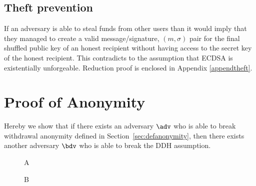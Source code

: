 \documentclass[a4paper,UKenglish,cleveref, autoref]{oasics-v2019}
\begin{document}
\begin{appendices}
\subsection{Theft prevention} 
If an adversary is able to steal funds from other users than it would imply that they managed to create a valid message/signature, $(m,\sigma)$ pair for the final shuffled public key of an honest recipient without having access to the secret key of the honest recipient. This contradicts to the assumption that ECDSA is existentially unforgeable. Reduction proof is enclosed in Appendix \ref*{appendtheft}.
	
	\section{Proof of Anonymity} \label{appendanon}
	Hereby we show that if there exists an adversary $\adv$ who is able to break withdrawal anonymity defined in Section~\ref{sec:defanonymity}, then there exists another adversary $\bdv$ who is able to break the DDH assumption.
	
	\begin{wrapfigure}{r}{0.5\textwidth}
		\centering
		\begin{bbrenv}{A}
			\begin{bbrbox} [name=\bdv]
				
				\begin{bbrenv}{B}
					\begin{bbrbox}[name=\adv]
					\end{bbrbox}
					
				\end{bbrenv}
				
			\end{bbrbox}
			
		\end{bbrenv}
		
	\end{wrapfigure}
	

\end{appendices}
\end{document}
